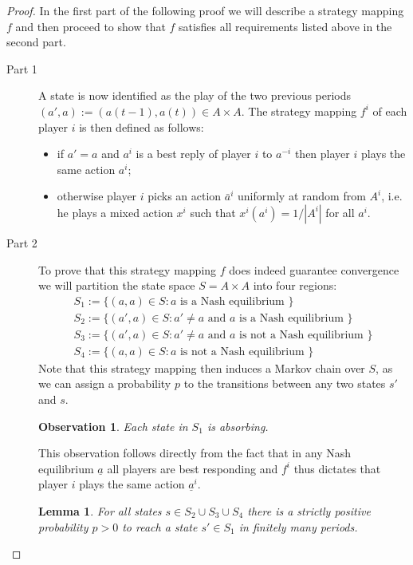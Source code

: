 \documentclass[a4paper]{article}
\theoremstyle{plain}
\newtheorem{observation}{Observation}
\newtheorem{lemma}{Lemma}
\theoremstyle{remark}
\newcommand{\eq}[1]{\underline{#1}}
\begin{document}
\begin{proof}
	In the first part of the following proof we will describe a strategy mapping $f$ and then proceed to
	show that $f$ satisfies all requirements listed above in the second part.
	\begin{description}
		\item[Part 1] A state is now identified as the play of the two previous periods $(a', a) := (a(t-1), a(t)) \in A \times A$.
			The strategy mapping $f^i$ of each player $i$ is then defined as follows:
			\begin{itemize}
				\item if $a' = a$ and $a^i$ is a best reply of player $i$ to $a^{-i}$ then player $i$ plays the
				same action $a^i$;
				\item otherwise player $i$ picks an action $\bar{a}^i$ uniformly at random from $A^i$, i.e. he plays
				a mixed action $x^i$ such that $x^i(a^i) = 1/|A^i|$ for all $a^i$.
			\end{itemize}
		\item[Part 2] To prove that this strategy mapping $f$ does indeed guarantee convergence we will
			partition the state space $S = A \times A$ into four regions:
			\begin{gather*}
				S_1 := \{ (a, a) \in S : a \text{ is a Nash equilibrium }\}\\
				S_2 := \{ (a', a) \in S : a' \neq a \text{ and } a \text{ is a Nash equilibrium }\}\\
				S_3 := \{ (a', a) \in S : a' \neq a \text{ and } a \text{ is not a Nash equilibrium }\}\\
				S_4 := \{ (a, a) \in S : a \text{ is not a Nash equilibrium }\}
			\end{gather*}
			Note that this strategy mapping then induces a Markov chain over $S$, as we can
			assign a probability $p$ to the transitions between any two states $s'$ and $s$.
			\begin{observation}
				Each state in $S_1$ is absorbing.
			\end{observation}
			This observation follows directly from the fact that in any Nash equilibrium $\eq{a}$ all players are best responding
			and $f^i$ thus dictates that player $i$ plays the same action $\eq{a}^i$.
			
			\begin{lemma}
				For all states $s \in S_2 \cup S_3 \cup S_4$ there is a strictly positive probability $p > 0$ to
				reach a state $s' \in S_1$ in finitely many periods. %
			\end{lemma}
			

\end{description}
\end{proof}
\end{document}
